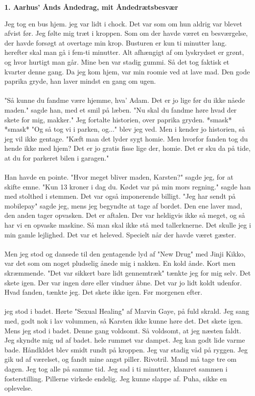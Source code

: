 \documentclass[]{article}
\begin{document}
\begin{center}
	\large\textbf{1. Aarhus' Ånds Åndedrag, mit Åndedrætsbesvær}
\end{center}

Jeg tog en bus hjem. jeg var lidt i chock. Det var som om hun aldrig var blevet afvist før. Jeg følte mig træt i kroppen. Som om der havde været en besværgelse, der havde forsøgt at overtage min krop. Busturen er kun ti minutter lang. herefter skal man gå i fem-ti minutter. Alt afhængigt af om lyskrydset er grønt, og hvor hurtigt man går. Mine ben var stadig gummi. Så det tog faktisk et kvarter denne gang. Da jeg kom hjem, var min roomie ved at lave mad. Den gode paprika gryde, han laver mindst en gang om ugen.
\\ \\
"Så kunne du fandme være hjemme, hva' Adam. Det er jo lige før du ikke nåede maden." sagde han, med et smil på læben. "Nu skal du fandme høre hvad der skete for mig, makker." Jeg fortalte historien, over paprika gryden. *smask* *smask* "Og så tog vi i parken, og..." blev jeg ved. Men i kender jo historien, så jeg vil ikke gentage. "Kæft man det lyder sygt homie. Men hvorfor fanden tog du hende ikke med hjem? Det er jo gratis fisse lige der, homie. Det er sku da på tide, at du for parkeret bilen i garagen." 
\\ \\
Han havde en pointe. "Hvor meget bliver maden, Karsten?" sagde jeg, for at skifte emne. "Kun 13 kroner i dag du. Kødet var på min mors regning." sagde han med stolthed i stemmen. Det var også imponerende billigt. "Jeg har sendt på mobilepay" sagde jeg, mens jeg begyndte at tage af bordet. Den ene laver mad, den anden tager opvasken. Det er aftalen. Der var heldigvis ikke så meget, og så har vi en opvaske maskine. Så man skal ikke stå med tallerknerne. Det skulle jeg i min gamle lejlighed. Det var et heleved. Specielt når der havde været gæster.
\\ \\
Men jeg stod og dansede til den gentagende lyd af "New Drug" med Jinji Kikko, var det som om noget pludselig ånede mig i nakken. En kold ånde. Kort men skræmmende. "Det var sikkert bare lidt gennemtræk" tænkte jeg for mig selv. Det skete igen. Der var ingen døre eller vinduer åbne. Det var jo lidt koldt udenfor. Hvad fanden, tænkte jeg. Det skete ikke igen. Før morgenen efter.
\\ \\
jeg stod i badet. Hørte "Sexual Healing" af Marvin Gaye, på fuld skrald. Jeg sang med, godt nok i lav volummen, så Karsten ikke kunne høre det. Det skete igen. Mens jeg stod i badet. Denne gang voldsomt. Så voldsomt, at jeg næsten faldt. Jeg skyndte mig ud af badet. hele rummet var dampet. Jeg kan godt lide varme bade. Håndkldet blev smidt rundt på kroppen. Jeg var stadig våd på ryggen. Jeg gik ud af værelset, og fandt mine angst piller. Rivotril. Mand må tage tre om dagen. Jeg tog alle på samme tid. Jeg sad i ti minutter, klamret sammen i fosterstilling. Pillerne virkede endelig. Jeg kunne slappe af. Puha, sikke en oplevelse. 
\end{document}
